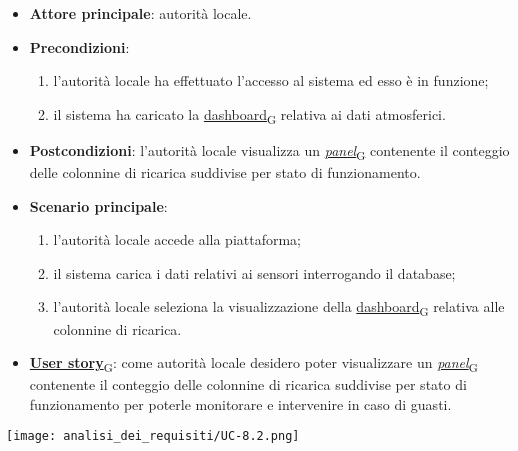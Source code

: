 \newpage

\begin{itemize}
	\item \textbf{Attore principale}: autorità locale.
	\item \textbf{Precondizioni}:
	      \begin{enumerate}
		      \item l'autorità locale ha effettuato l'accesso al sistema ed esso è in funzione;
		      \item il sistema ha caricato la \href{https://7last.github.io/docs/rtb/documentazione-interna/glossario\#dashboard}{dashboard\textsubscript{G}} relativa ai dati atmosferici.
	      \end{enumerate}
	\item \textbf{Postcondizioni}: l'autorità locale visualizza un \href{https://7last.github.io/docs/rtb/documentazione-interna/glossario\#panel}{\textit{panel}\textsubscript{G}} contenente il conteggio delle colonnine di ricarica suddivise per stato di funzionamento.
	\item \textbf{Scenario principale}:
	      \begin{enumerate}
		      \item l'autorità locale accede alla piattaforma;
		      \item il sistema carica i dati relativi ai sensori interrogando il database;
		      \item l'autorità locale seleziona la visualizzazione della \href{https://7last.github.io/docs/rtb/documentazione-interna/glossario\#dashboard}{dashboard\textsubscript{G}} relativa alle colonnine di ricarica.
	      \end{enumerate}
	\item \href{https://7last.github.io/docs/rtb/documentazione-interna/glossario\#user-story}{\textbf{User story}\textsubscript{G}}:
	      come autorità locale desidero poter visualizzare un \href{https://7last.github.io/docs/rtb/documentazione-interna/glossario\#panel}{\textit{panel}\textsubscript{G}} contenente il conteggio delle colonnine di ricarica suddivise per stato di funzionamento
	      per poterle monitorare e intervenire in caso di guasti.
\end{itemize}
\begin{center}
	\texttt{[image: analisi\_dei\_requisiti/UC-8.2.png]}
\end{center}

